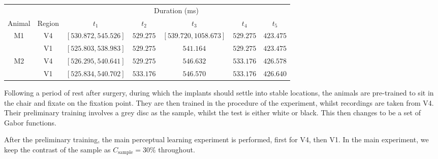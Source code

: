 \begin{table}[hbtp]
{%
%
\begin{tabular}{ccccccc}
\toprule
        &       & \multicolumn{5}{c}{Duration (\si{\milli\second})} \\
\cmidrule(l){3-7}
Animal  & Region& $t_1$                & $t_2$     & $t_3$                  & $t_4$     & $t_5$     \\
\midrule
M1      & V4    & $[530.872, 545.526]$ & $529.275$ & $[539.720, 1058.673]$  & $529.275$ & $423.475$ \\
        & V1    & $[525.803, 538.983]$ & $529.275$ & $541.164$              & $529.275$ & $423.475$ \\
M2      & V4    & $[526.295, 540.641]$ & $529.275$ & $546.632$              & $533.176$ & $426.578$ \\
        & V1    & $[525.834, 540.702]$ & $533.176$ & $546.570$              & $533.176$ & $426.640$ \\
\bottomrule
%
\end{tabular}
} %
\end{table}

Following a period of rest after surgery, during which the implants should settle into stable locations, the animals are pre-trained to sit in the chair and fixate on the fixation point.
They are then trained in the procedure of the experiment, whilst recordings are taken from \ac{V4}.
Their preliminary training involves a grey disc as the sample, whilst the test is either white or black.
This then changes to be a set of Gabor functions.


After the preliminary training, the main perceptual learning experiment is performed, first for \ac{V4}, then \ac{V1}.
In the main experiment, we keep the contrast of the sample as $C_\text{sample} = 30\%$ throughout.

